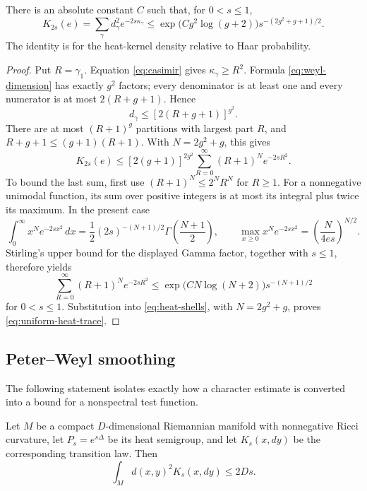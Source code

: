 \begin{lemma}
\label{lem:uniform-heat-trace}
There is an absolute constant \(C\) such that, for \(0<s\le1\),
\begin{equation}
 \boxed{
 K_{2s}(e)=\sum_\gamma d_\gamma^2e^{-2s\kappa_\gamma}
 \le \exp\!\bigl(Cg^2\log(g+2)\bigr)
       s^{-(2g^2+g+1)/2}.}
\label{eq:uniform-heat-trace}
\end{equation}
The identity is for the heat-kernel density relative to Haar probability.
\end{lemma}

\begin{proof}
Put \(R=\gamma_1\).  Equation \eqref{eq:casimir} gives
\(\kappa_\gamma\ge R^2\).  Formula \eqref{eq:weyl-dimension} has exactly
\(g^2\) factors; every denominator is at least one and every numerator is at
most \(2(R+g+1)\).  Hence
\begin{equation}
 d_\gamma\le[2(R+g+1)]^{g^2}.
\label{eq:dimension-crude}
\end{equation}
There are at most \((R+1)^g\) partitions with largest part \(R\), and
\(R+g+1\le(g+1)(R+1)\).  With \(N=2g^2+g\), this gives
\begin{equation}
 K_{2s}(e)
 \le[2(g+1)]^{2g^2}
     \sum_{R=0}^\infty(R+1)^Ne^{-2sR^2}.
\label{eq:heat-shells}
\end{equation}
To bound the last sum, first use \((R+1)^N\le2^NR^N\) for \(R\ge1\).
For a nonnegative unimodal function, its sum over positive integers is at
most its integral plus twice its maximum.  In the present case
\[
 \int_0^\infty x^Ne^{-2sx^2}\,dx
 =\frac12(2s)^{-(N+1)/2}
   \Gamma\!\left(\frac{N+1}{2}\right),
 \qquad
 \max_{x\ge0}x^Ne^{-2sx^2}
 =\left(\frac{N}{4es}\right)^{N/2}.
\]
Stirling's upper bound for the displayed Gamma factor, together with
\(s\le1\), therefore yields
\[
 \sum_{R=0}^\infty(R+1)^Ne^{-2sR^2}
 \le \exp\!\bigl(CN\log(N+2)\bigr)s^{-(N+1)/2}
\]
for \(0<s\le1\).  Substitution into \eqref{eq:heat-shells}, with
\(N=2g^2+g\), proves \eqref{eq:uniform-heat-trace}.
\end{proof}

\subsection{Peter--Weyl smoothing}

The following statement isolates exactly how a character estimate is
converted into a bound for a nonspectral test function.

\begin{lemma}
\label{lem:brownian-displacement}
Let \(M\) be a compact \(D\)-dimensional Riemannian manifold with
nonnegative Ricci curvature, let \(P_s=e^{s\Delta}\) be its heat semigroup,
and let \(K_s(x,dy)\) be the corresponding transition law.  Then
\begin{equation}
 \int_M d(x,y)^2K_s(x,dy)\le2Ds.
\label{eq:brownian-distance}
\end{equation}
\end{lemma}

